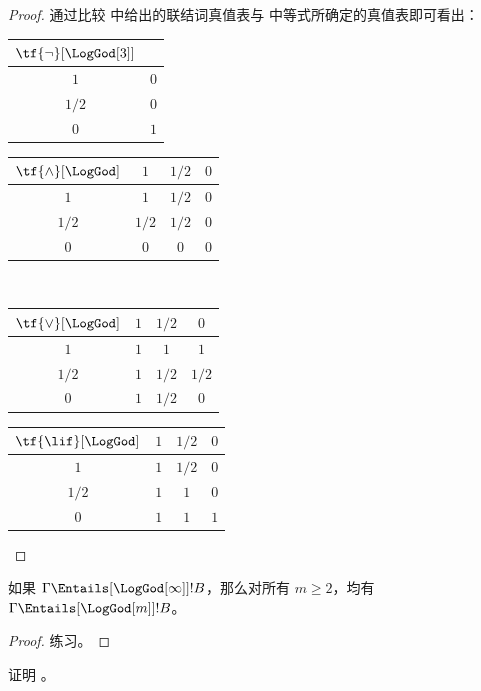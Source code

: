 \documentclass[../../../include/open-logic-section]{subfiles}
\begin{document}
\begin{proof}
  通过比较  中给出的联结词真值表与  中等式所确定的真值表即可看出：
  \begin{center}
    \begin{tabular}{c|c}
      $\tf{\lnot}[\LogGod[3]]$ & \\
      \hline
      $1$ & $0$ \\
      $1/2$ & $0$ \\
      $0$ & $1$
    \end{tabular}
    \quad
    \begin{tabular}{c|ccc}
      $\tf{\land}[\LogGod]$ & $1$ & $1/2$ & $0$ \\
      \hline
      $1$ & $1$ & $1/2$ & $0$ \\
      $1/2$ & $1/2$ & $1/2$ & $0$\\
      $0$ & $0$ & $0$ & $0$
    \end{tabular}
    \\[2ex]
    \begin{tabular}{c|ccc}
      $\tf{\lor}[\LogGod]$ & $1$ & $1/2$ & $0$ \\
      \hline
      $1$ & $1$ & $1$ & $1$ \\
      $1/2$ & $1$ & $1/2$ & $1/2$ \\
      $0$ & $1$ & $1/2$ & $0$
    \end{tabular}
    \quad
    \begin{tabular}{c|ccc}
      $\tf{\lif}[\LogGod]$ & $1$ & $1/2$ & $0$ \\
      \hline
      $1$ & $1$ & $1/2$ & $0$ \\
      $1/2$ & $1$ & $1$ & $0$  \\
      $0$ & $1$ & $1$ & $1$
    \end{tabular}
  \end{center}
\end{proof}

\begin{prop}
  如果 $\Gamma \Entails[\LogGod[\infty]] !B$，那么对所有 $m \ge 2$，均有 $\Gamma \Entails[\LogGod[m]] !B$。
\end{prop}

\begin{proof}
  练习。
\end{proof}

\begin{prob}
  证明 。
\end{prob}
\end{document}
